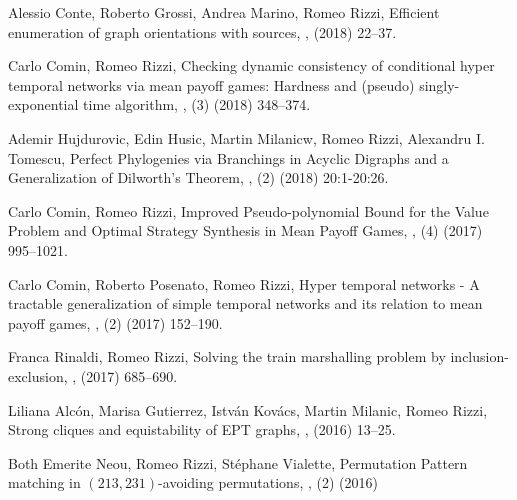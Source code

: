 \begin{etaremune}
  \vspace{-3.0mm}
  
  \item {\sc Alessio Conte, Roberto Grossi, Andrea Marino, Romeo Rizzi},
   \newblock Efficient enumeration of graph orientations with sources,
   ,
    (2018) 22--37.

  \item {\sc Carlo Comin, Romeo Rizzi},
   \newblock Checking dynamic consistency of conditional hyper temporal networks via mean payoff games: Hardness and (pseudo) singly-exponential time algorithm,
   ,
   (3) (2018) 348--374.

  \item {\sc Ademir Hujdurovic, Edin Husic, Martin Milanicw, Romeo Rizzi, Alexandru I. Tomescu},
   \newblock Perfect Phylogenies via Branchings in Acyclic Digraphs and a Generalization of Dilworth's Theorem,
   ,
   (2) (2018) 20:1-20:26.

  \item {\sc Carlo Comin, Romeo Rizzi},
   \newblock Improved Pseudo-polynomial Bound for the Value Problem and Optimal Strategy Synthesis in Mean Payoff Games,
   ,
   (4) (2017) 995--1021.

  \item {\sc Carlo Comin, Roberto Posenato, Romeo Rizzi},
   \newblock Hyper temporal networks - A tractable generalization of simple temporal networks and its relation to mean payoff games,
   ,
   (2) (2017) 152--190.

  \item {\sc Franca Rinaldi, Romeo Rizzi},
   \newblock Solving the train marshalling problem by inclusion-exclusion,
   ,
    (2017) 685--690.

  \item {\sc Liliana Alcón, Marisa Gutierrez, István Kovács, Martin Milanic, Romeo Rizzi},
   \newblock Strong cliques and equistability of EPT graphs,
   ,
    (2016) 13--25.

  \item {\sc Both Emerite Neou, Romeo Rizzi, Stéphane Vialette},
   \newblock Permutation Pattern matching in $(213, 231)$-avoiding permutations,
   ,
   (2) (2016)
   

\end{etaremune}
